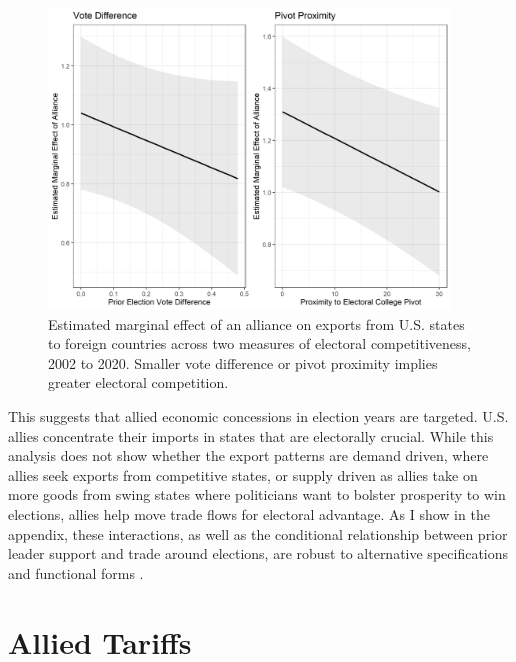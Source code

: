 \documentclass[12pt]{article}
\begin{document}
\begin{figure}[htpb]
	\centering
		\includegraphics[width=0.95\textwidth]{../figures/me-all-state.png}
	\caption{Estimated marginal effect of an alliance on exports from U.S. states to foreign countries across two measures of electoral competitiveness, 2002 to 2020. Smaller vote difference or pivot proximity implies greater electoral competition.}
	\label{fig:me-all-state}
\end{figure}


This suggests that allied economic concessions in election years are targeted. 
U.S. allies concentrate their imports in states that are electorally crucial.
While this analysis does not show whether the export patterns are demand driven, where allies seek exports from competitive states, or supply driven as allies take on more goods from swing states where politicians want to bolster prosperity to win elections, allies help move trade flows for electoral advantage. 
As I show in the appendix, these interactions, as well as the conditional relationship between prior leader support and trade around elections, are robust to alternative specifications and functional forms \citep{Hainmuelleretal2019}.



\section{Allied Tariffs} 





\singlespace
 
 
\end{document}
